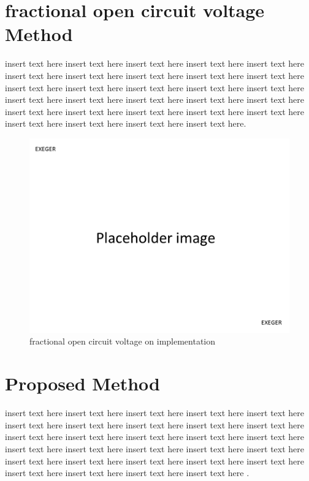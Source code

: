  \section{fractional open circuit voltage Method }
 insert text here insert text here insert text here insert text here insert text here
 insert text here insert text here insert text here insert text here insert text here insert text here insert text here insert text here insert text here insert text here insert text here insert text here insert text here insert text here insert text here insert text here insert text here insert text here insert text here insert text here insert text here insert text here insert text here insert text here.   \\
 \begin{figure}[H]
  \begin{center}
  \includegraphics[width=\textwidth]{images/pacehold}
  \caption{ fractional open circuit voltage on implementation}
  \label{fig:Frac_oc_result}
  \end{center}
  \end{figure}
\section{Proposed Method }
insert text here insert text here insert text here insert text here insert text here
insert text here insert text here insert text here insert text here insert text here insert text here insert text here insert text here insert text here insert text here insert text here insert text here insert text here insert text here insert text here insert text here insert text here insert text here insert text here insert text here insert text here insert text here insert text here insert text here . \\


